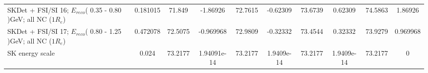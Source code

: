 \begin{tabular}{| l | S | S  S | S  S | S  S | S  S | }
              SKDet + FSI/SI 16; $E_{reco}$( 0.35 - 0.80 )GeV; all NC ($1R_{e}$) &        0.181015 &          71.849 &        -1.86926 &         72.7615 &        -0.62309 &         73.6739 &         0.62309 &         74.5863 &         1.86926 \\ 
              SKDet + FSI/SI 17; $E_{reco}$( 0.80 - 1.25 )GeV; all NC ($1R_{e}$) &        0.472078 &         72.5075 &       -0.969968 &         72.9809 &        -0.32332 &         73.4544 &         0.32332 &         73.9279 &        0.969968 \\ 
                                                                 SK energy scale &           0.024 &         73.2177 &     1.94091e-14 &         73.2177 &      1.9409e-14 &         73.2177 &      1.9409e-14 &         73.2177 &               0 \\ 
\bottomrule
\end{tabular}
